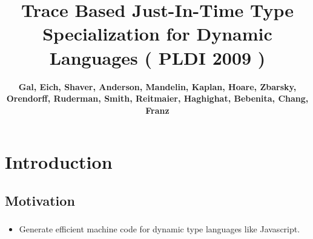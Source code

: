 \documentclass[mathserif,10pt]{beamer}
\title{Trace Based Just-In-Time Type Specialization for Dynamic Languages ( PLDI 2009 )}
\author{{\textbf{Gal, Eich, Shaver, Anderson, Mandelin, Kaplan, Hoare, Zbarsky, Orendorff, Ruderman, Smith, Reitmaier, Haghighat, Bebenita, Chang, Franz}} }
\newcommand{\cmt}[1]{}
\begin{document}
  \begin{frame}
  \titlepage
  \end{frame}


\section{Introduction}
\subsection{Motivation}
\frame
{
  \frametitle{\subsecname}
  \begin{itemize}
  \item Generate efficient machine code for dynamic type languages like Javascript. \\
    \begin{itemize}
    \end{itemize}
  \end{itemize}
}
\cmt{Applications written in modern dynamic languages such as Java or .NET are shipped in
the form of high-level intermediate bytecode. This offers two distinct advantages over
shipping programs directly as compiled machine code. On the one hand the bytecode is
architecture independent and can be executed on different target systems using different
native instruction sets and software frameworks (i.e. operating systems). This makes
bytecode programs portable across target platforms.

Without static information about the types of res and v, a JIT
compiler must emit code to handle all possible combinations of
operand types. Moreover, every time values are copied around, the
compiler must emit code to keep track of the types of the involved
values, using either a separate type tag for the value or a specialized
marshaling format. This incurs a large runtime overhead on the
generated code, greatly increases the complexity of the compiler,
and makes effective implementation of important optimizations
like register allocation and loop invariant code motion much harder

      \uncover<3>{ \item Bytecode interpreter becomes slow}
}
\end{document}

